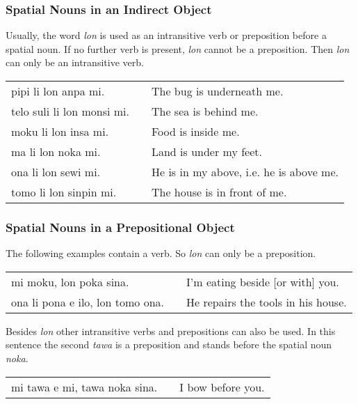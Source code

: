 %
\subsubsection*{Spatial Nouns in an Indirect Object}
%
%
%
Usually, the word \textit{lon} is used as an intransitive verb or preposition before a spatial noun. 
If no further verb is present, \textit{lon} cannot be a preposition. 
Then \textit{lon} can only be an intransitive verb.

\begin{supertabular}{p{5,5cm}|ll}
pipi li lon anpa mi.       && The bug is underneath me. \\
telo suli li lon monsi mi. && The sea is behind me.  \\
moku li lon insa mi.       && Food is inside me. \\
ma li lon noka mi.         && Land is under my feet. \\
ona li lon sewi mi.        && He is in my above, i.e. he is above me. \\
tomo li lon sinpin mi.     && The house is in front of me. \\
\end{supertabular} 

%
\subsubsection*{Spatial Nouns in a Prepositional Object}
%
%

The following examples contain a verb. 
So \textit{lon} can only be a preposition. 

\begin{supertabular}{p{5,5cm}|ll}
mi moku, lon poka sina.    && I'm eating beside [or with] you. \\
ona li pona e ilo, lon tomo ona. && He repairs the tools in his house. \\
\end{supertabular} 

Besides \textit{lon} other intransitive verbs and prepositions can also be used. 
In this sentence the second \textit{tawa} is a preposition and stands before the spatial noun \textit{noka}. 

\begin{supertabular}{p{5,5cm}|ll}
mi tawa e mi, tawa noka sina. && I bow before you. \\
\end{supertabular} 

